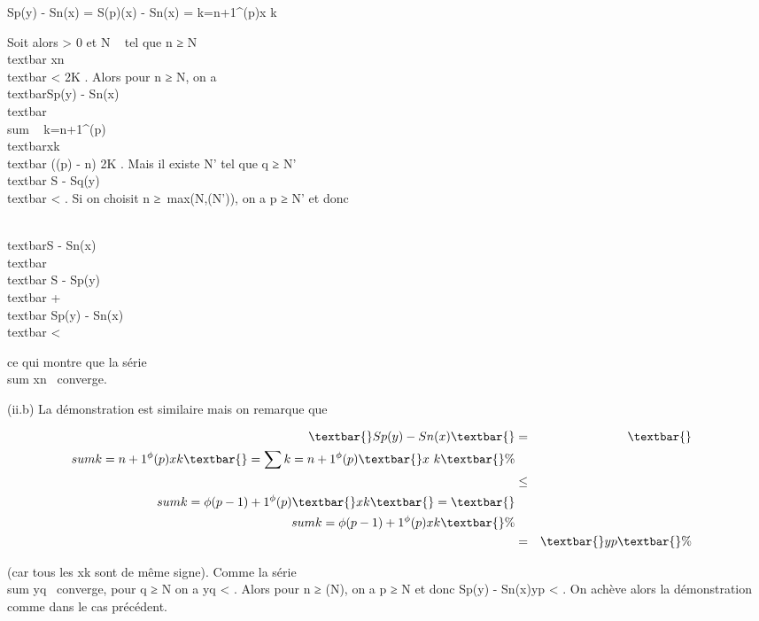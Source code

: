 Sp(y) - Sn(x) = S\phi(p)(x) - Sn(x)
= \sum k=n+1^\phi(p)x k~

Soit alors \epsilon \textgreater{} 0 et N \in {}~ tel que n ≥ N
\rigtharrow~\\textbar{} xn\\textbar{}
\textless{} \epsilon \over 2K . Alors pour n ≥ N, on a
\\textbar{}Sp(y) -
Sn(x)\\textbar{}
\leq\\sum ~
k=n+1^\phi(p)\\textbar{}xk\\textbar{}
\leq (\phi(p) - n) \epsilon \over 2K \leq \epsilon {} . Mais il existe N' tel que q ≥ N' \rigtharrow~\\textbar{} S -
Sq(y)\\textbar{} \textless{} \epsilon
{} . Si on choisit n ≥\
max(N,\phi(N')), on a p ≥ N' et donc

\\textbar{}S - Sn(x)\\textbar{}
\leq\\textbar{} S -
Sp(y)\\textbar{} +\\textbar{}
Sp(y) - Sn(x)\\textbar{} \textless{}
\epsilon

ce qui montre que la série
\\sum  xn~
converge.

(ii.b) La démonstration est similaire mais on remarque que

\begin{align*} \textbar{}Sp(y) -
Sn(x)\textbar{}& =& \textbar{}\\sum
k=n+1^\phi(p)x k\textbar{} =
\sum k=n+1^\phi(p)\textbar{}x~
k\textbar{} \%& \\ & \leq&
\\sum
k=\phi(p-1)+1^\phi(p)\textbar{}x k\textbar{} =
\textbar{}\\sum
k=\phi(p-1)+1^\phi(p)x k\textbar{}\%&
\\ & =& \textbar{}yp\textbar{}
\%& \\ \end{align*}

(car tous les xk sont de même signe). Comme la série
\\sum  yq~
converge, pour q ≥ N on a \textbar{}yq\textbar{} \textless{}
\epsilon {} . Alors pour n ≥ \phi(N), on a p ≥ N et donc
\textbar{}Sp(y) -
Sn(x)\textbar{}\leq\textbar{}yp\textbar{} \textless{}
\epsilon {} . On achève alors la démonstration comme dans
le cas précédent.

